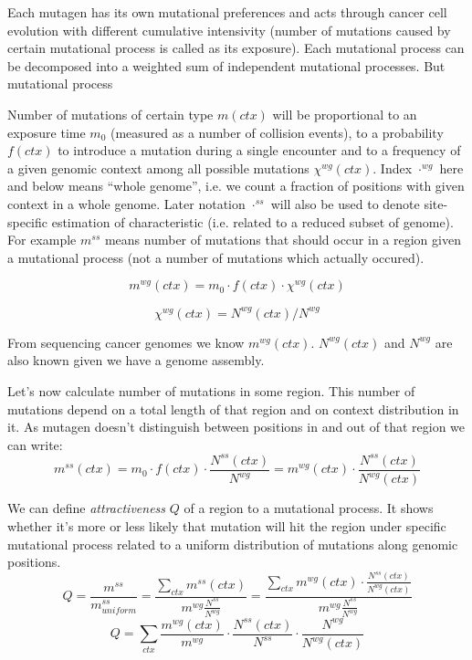 \documentclass[a4paper]{article}
\begin{document}
Each mutagen has its own mutational preferences and acts through cancer cell evolution with different cumulative intensivity (number of mutations caused by certain mutational process is called as its exposure). Each mutational process can be decomposed into a weighted sum of independent mutational processes. But mutational process 


Number of mutations of certain type $m(ctx)$ will be proportional to an exposure time $m_0$ (measured as a number of collision events), to a probability $f(ctx)$ to introduce a mutation during a single encounter and to a frequency of a given genomic context among all possible mutations $\chi^{wg}(ctx)$. Index $\cdot^{wg}$ here and below means ``whole genome'', i.e. we count a fraction of positions with given context in a whole genome. Later notation $\cdot^{ss}$ will also be used to denote site-specific estimation of characteristic (i.e. related to a reduced subset of genome). For example $m^{ss}$ means number of mutations that should occur in a region given a mutational process (not a number of mutations which actually occured).

\begin{equation}
	m^{wg}(ctx) = m_0 \cdot f(ctx) \cdot \chi^{wg}(ctx)
\end{equation}

\begin{equation}
	\chi^{wg}(ctx) = N^{wg}(ctx)/N^{wg}
\end{equation}

From sequencing cancer genomes we know $m^{wg}(ctx)$. $N^{wg}(ctx)$ and $N^{wg}$ are also known given we have a genome assembly.

Let's now calculate number of mutations in some region. This number of mutations depend on a total length of that region and on context distribution in it. As mutagen doesn't distinguish between positions in and out of that region we can write:
\begin{equation}
	m^{ss}(ctx) = m_0 \cdot f(ctx) \cdot \frac{N^{ss}(ctx)}{N^{wg}} = m^{wg}(ctx)\cdot \frac{N^{ss}(ctx)}{N^{wg}(ctx)}
\end{equation}

We can define \textit{attractiveness} $Q$ of a region to a mutational process. It shows whether it's more or less likely that mutation will hit the region under specific mutational process related to a uniform distribution of mutations along genomic positions.
\begin{equation}
	Q = \frac{m^{ss}}{m^{ss}_{uniform}} = \frac{\sum_{ctx} m^{ss}(ctx)}{m^{wg}\frac{N^{ss}}{N^{wg}}} = \frac{\sum_{ctx} m^{wg}(ctx)\cdot \frac{N^{ss}(ctx)}{N^{wg}(ctx)}}{m^{wg}\frac{N^{ss}}{N^{wg}}}
\end{equation}
\begin{equation}
	Q = \sum_{ctx}\frac{ m^{wg}(ctx) }{m^{wg}} \cdot \frac{N^{ss}(ctx)}{N^{ss}} \cdot \frac{N^{wg}}{N^{wg}(ctx)}
\end{equation}
\end{document}
